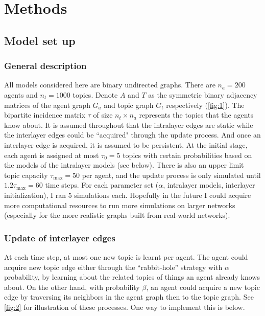 \section{Methods}

\subsection{Model set up}


\subsubsection*{General description}



All models considered here are binary undirected graphs. There are $n_a = 200$ agents and $n_t = 1000$ topics. Denote $A$ and $T$ as the symmetric binary adjacency matrices of the agent graph $G_a$ and topic graph $G_t$ respectively (\autoref{fig:1}). The bipartite incidence matrix $\tau$ of size $n_t \times n_a$ represents the topics that the agents know about. It is assumed throughout that the intralayer edges are static while the interlayer edges could be ``acquired" through the update process. And once an interlayer edge is acquired, it is assumed to be persistent. At the initial stage, each agent is assigned at most $\tau_0 = 5$ topics with certain probabilities based on the models of the intralayer models (see below). There is also an upper limit topic capacity $\tau_{\mathrm{max}} = 50$ per agent, and the update process is only simulated until $1.2 \tau_{\mathrm{max}} = 60$ time steps. For each parameter set ($\alpha$, intralayer models, interlayer initialization), I ran 5 simulations each. Hopefully in the future I could acquire more computational resources to run more simulations on larger networks (especially for the more realistic graphs built from real-world networks).

\subsubsection*{Update of interlayer edges}

At each time step, at most one new topic is learnt per agent. The agent could acquire new topic edge either through the ``rabbit-hole'' strategy with $\alpha$ probability, by learning about the related topics of things an agent already knows about. On the other hand, with probability $\beta$, an agent could acquire a new topic edge by traversing its neighbors in the agent graph then to the topic graph. See \autoref{fig:2} for illustration of these processes. One way to implement this is below.

